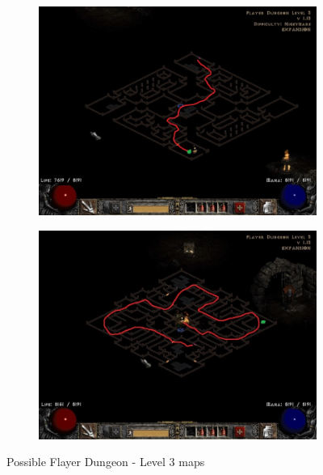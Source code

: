 \begin{figure}[H]
	\smallskip
	\begin{subfigure}{0.495\hsize}
		\centering
		\includegraphics[width=\hsize]{Assets/FlayerDungeon3_5}
	\end{subfigure}
	\hfill
	\begin{subfigure}{0.495\hsize}
		\centering
		\includegraphics[width=\hsize]{Assets/FlayerDungeon3_6}
	\end{subfigure}
	\caption{Possible Flayer Dungeon - Level 3 maps\cite{flayerdungeon3maps}}
	\label{Figure:MapsActIIFlayerDungeonLevel3}
\end{figure}
